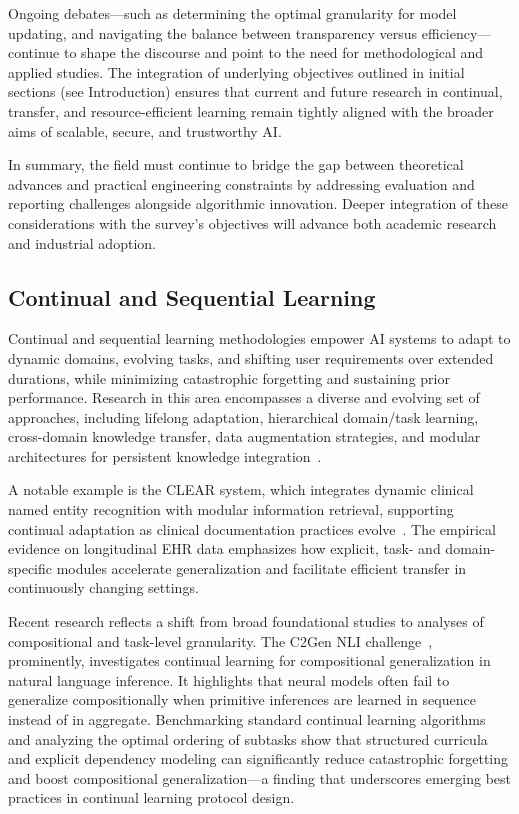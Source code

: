 \documentclass[sigconf]{acmart}
\begin{document}
Ongoing debates—such as determining the optimal granularity for model updating, and navigating the balance between transparency versus efficiency—continue to shape the discourse and point to the need for methodological and applied studies. The integration of underlying objectives outlined in initial sections (see Introduction) ensures that current and future research in continual, transfer, and resource-efficient learning remain tightly aligned with the broader aims of scalable, secure, and trustworthy AI.

In summary, the field must continue to bridge the gap between theoretical advances and practical engineering constraints by addressing evaluation and reporting challenges alongside algorithmic innovation. Deeper integration of these considerations with the survey's objectives will advance both academic research and industrial adoption.

\subsection{Continual and Sequential Learning}

Continual and sequential learning methodologies empower AI systems to adapt to dynamic domains, evolving tasks, and shifting user requirements over extended durations, while minimizing catastrophic forgetting and sustaining prior performance. Research in this area encompasses a diverse and evolving set of approaches, including lifelong adaptation, hierarchical domain/task learning, cross-domain knowledge transfer, data augmentation strategies, and modular architectures for persistent knowledge integration~\cite{ref7,ref18,ref19,ref20,ref21,ref22,ref23,ref24,ref26,ref29,ref30,ref46,ref54,ref55,ref61,ref62,ref64}.

A notable example is the CLEAR system, which integrates dynamic clinical named entity recognition with modular information retrieval, supporting continual adaptation as clinical documentation practices evolve~\cite{ref7}. The empirical evidence on longitudinal EHR data emphasizes how explicit, task- and domain-specific modules accelerate generalization and facilitate efficient transfer in continuously changing settings.

Recent research reflects a shift from broad foundational studies to analyses of compositional and task-level granularity. The C2Gen NLI challenge~\cite{ref18,ref46}, prominently, investigates continual learning for compositional generalization in natural language inference. It highlights that neural models often fail to generalize compositionally when primitive inferences are learned in sequence instead of in aggregate. Benchmarking standard continual learning algorithms and analyzing the optimal ordering of subtasks show that structured curricula and explicit dependency modeling can significantly reduce catastrophic forgetting and boost compositional generalization—a finding that underscores emerging best practices in continual learning protocol design.
\end{document}
